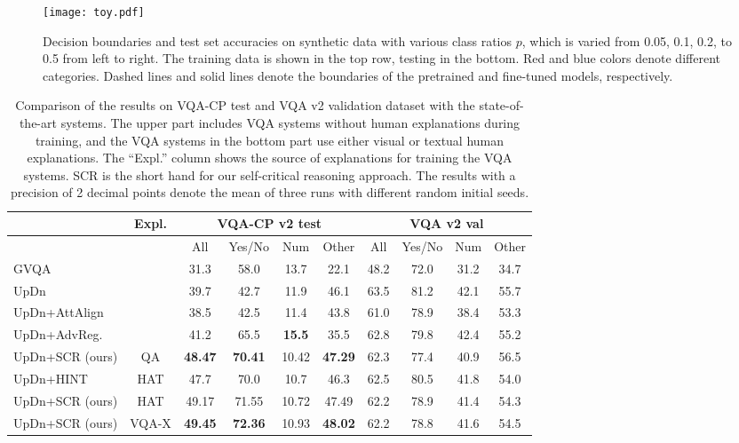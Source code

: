 \documentclass{article}
\begin{document}
\begin{figure}[!t]
    \centering
    \texttt{[image: toy.pdf]}
    \caption{Decision boundaries and test set accuracies on synthetic data with various class ratios $p$, which is varied from 0.05, 0.1, 0.2, to 0.5 from left to right. The training data is shown in the top row, testing in the bottom. Red and blue colors denote different categories. Dashed lines and solid lines denote the boundaries of the pretrained and fine-tuned models, respectively.}
    \label{fig:toy}
\end{figure}



\begin{table}[!t]
\centering
\begin{tabular}{l|c|cccc|cccc}
\hline \toprule
                    & Expl. & \multicolumn{4}{c}{VQA-CP v2 test} & \multicolumn{4}{|c}{VQA v2 val} \\    \hline
              &       & {\footnotesize All}     & {\footnotesize Yes/No} &  {\footnotesize Num } & {\footnotesize Other} &  {\footnotesize All}   & {\footnotesize Yes/No} &  {\footnotesize Num}  &  {\footnotesize Other} \\ \hline\hline
GVQA\cite{vqa-cp}          &       &  31.3   &  58.0  & 13.7  & 22.1  &  48.2   &  72.0  & 31.2  & 34.7 \\
UpDn    \cite{anderson2017bottom}            &       &  39.7   &  42.7  & 11.9  & 46.1  &  63.5   &  81.2  & 42.1  & 55.7 \\
UpDn+AttAlign \cite{selvaraju2019taking}    &       &  38.5   &  42.5  & 11.4  & 43.8  &  61.0   &  78.9  & 38.4  & 53.3 \\
UpDn+AdvReg.    \cite{ramakrishnan2018overcoming}    &       &  41.2   &  65.5  & \textbf{15.5}  & 35.5  &  62.8   &  79.8  & 42.4  & 55.2 \\
UpDn+SCR (ours)   & {\footnotesize  QA}   &  \textbf{48.47}   &  \textbf{70.41}  & 10.42  & \textbf{47.29}  &  62.3   &  77.4  & 40.9  & 56.5     \\ \hline
UpDn+HINT   \cite{selvaraju2019taking}        & {\footnotesize  HAT}  &  47.7   &  70.0  & 10.7  & 46.3  &  62.5   &  80.5  & 41.8  & 54.0 \\
UpDn+SCR (ours)   & {\footnotesize  HAT}  &  49.17   &  71.55  & 10.72  & 47.49  &  62.2   &  78.9  & 41.4  & 54.3  \\
UpDn+SCR (ours)   &{\footnotesize VQA-X} &  \textbf{49.45} &  \textbf{72.36}  & 10.93  & \textbf{48.02}  &  62.2   &  78.8  & 41.6  & 54.5   \\\bottomrule
\end{tabular}
\caption{Comparison of the results on VQA-CP test and VQA v2 validation dataset with the state-of-the-art systems. The upper part includes VQA systems without human explanations during training, and the VQA systems in the bottom part use either visual or textual human explanations. The ``Expl.'' column shows the source of explanations for training the VQA systems. SCR is the short hand for our self-critical reasoning approach. The results with a precision of 2 decimal points denote the mean of three runs with different random initial seeds.}
\label{tab:vqa_compare}
\end{table}
\end{document}
